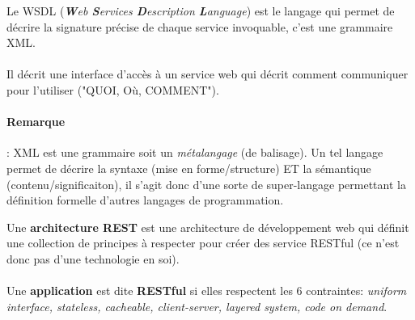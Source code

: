\item{}
{\vrai}
{Le WSDL (\textit{\textbf{W}eb \textbf{S}ervices \textbf{D}escription \textbf{L}anguage}) est le langage qui permet de décrire la signature précise de chaque service invoquable, c'est une grammaire XML.
\paragraph{}
Il décrit une interface d'accès à un service web qui décrit comment communiquer pour l'utiliser ("QUOI, Où, COMMENT").

\paragraph{Remarque}: XML est une grammaire soit un \textit{métalangage} (de balisage). Un tel langage permet de décrire la syntaxe (mise en forme/structure) ET la sémantique (contenu/significaiton), il s'agit donc d'une sorte de super-langage permettant la définition formelle d'autres langages de programmation.
}

\item{}
{\vrai}
{
Une \textbf{architecture REST} est une architecture de développement web qui définit une collection de principes à respecter pour créer des service RESTful (ce n'est donc pas d'une technologie en soi).
\paragraph{}
Une \textbf{application} est dite \textbf{RESTful} si elles respectent les 6 contraintes: \textit{uniform interface, stateless, cacheable, client-server, layered system, code on demand}.
}

